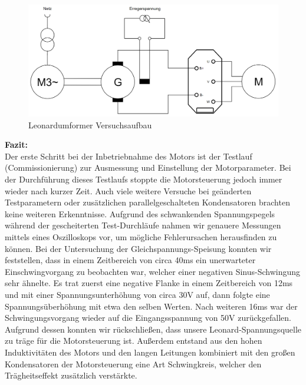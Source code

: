 \begin{figure}[H]
	\begin{center}
		\includegraphics[width=\textwidth]{figures/antrieb/Leonard_Umformer.png}
		\caption{Leonardumformer Versuchsaufbau}
	\end{center}
\end{figure}

\newpage

\textbf{Fazit:}
\\[2mm]
Der erste Schritt bei der Inbetriebnahme des Motors ist der Testlauf (Commissionierung) zur Ausmessung und Einstellung der Motorparameter. Bei der Durchführung dieses Testlaufs stoppte die Motorsteuerung jedoch immer wieder nach kurzer Zeit. Auch viele weitere Versuche bei geänderten Testparametern oder zusätzlichen parallelgeschalteten Kondensatoren brachten keine weiteren Erkenntnisse. Aufgrund des schwankenden Spannungspegels während der gescheiterten Test-Durchläufe nahmen wir genauere Messungen mittels eines Oszilloskops vor, um mögliche Fehlerursachen herausfinden zu können. Bei der Untersuchung der Gleichspannungs-Speisung konnten wir feststellen, dass in einem Zeitbereich von circa 40ms ein unerwarteter Einschwingvorgang zu beobachten war, welcher einer negativen Sinus-Schwingung sehr ähnelte. Es trat zuerst eine negative Flanke in einem Zeitbereich von 12ms und mit einer Spannungsunterhöhung von circa 30V auf, dann folgte eine Spannungsüberhöhung mit etwa den selben Werten. Nach weiteren 16ms war der Schwingungsvorgang wieder auf die Eingangsspannung von 50V zurückgefallen. Aufgrund dessen konnten wir rückschließen, dass unsere Leonard-Spannungsquelle zu träge für die Motorsteuerung ist. Außerdem entstand aus den hohen Induktivitäten des Motors und den langen Leitungen kombiniert mit den großen Kondensatoren der Motorsteuerung eine Art Schwingkreis, welcher den Trägheitseffekt zusätzlich verstärkte.
\vspace{5mm}

